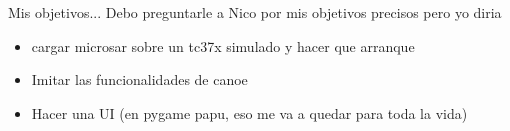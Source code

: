 Mis objetivos... Debo preguntarle a Nico por mis objetivos precisos pero yo diria 
\begin{itemize}
    \item cargar microsar sobre un tc37x simulado y hacer que arranque
    \item Imitar las funcionalidades de canoe
    \item Hacer una UI (en pygame papu, eso me va a quedar para toda la vida)
\end{itemize}